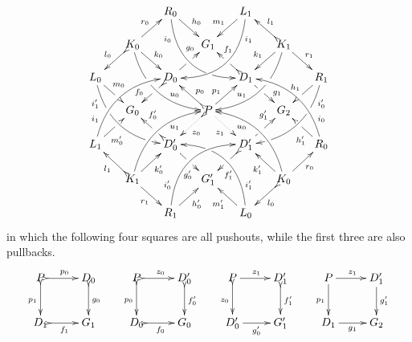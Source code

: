 \begin{lemma}
\begin{enumerate}
	\[\xymatrix@C=15pt@R=15pt{&&R_0 \ar@/_.8cm/[ddrr]_(.2){i_0}|(.7)\hole
		\ar[dr]^{h_0}&& L_1\ar@/^.8cm/[ddll]^(.2){i_1}
		\ar[dl]_{m_1}\\&K_0\ar[dr]^{k_0}\ar@{>->}[dl]_{l_0}
		\ar@/_.6cm/[ddrr]|(.36)\hole^(.65){u_0}\ar[ur]^{r_0}&& G_1 &&
		K_1
		\ar@/^.6cm/[ddll]|(.36)\hole_(.65){u_1}\ar[dl]_{k_1}\ar@{>->}[lu]_{l_1}
		\ar[dr]^{r_1}\\L_0
		\ar@/_.6cm/[ddrr]_(.2){i'_1}|(.31)\hole|(.81)\hole
		\ar[dr]^(.4){m_0}|(.61)\hole && D_0
		\ar@{>->}[dl]|(.4)\hole_(.65){f_0}\ar[ur]|(.5)\hole^(.7){g_0}&&D_1
		\ar[dr]|(.4)\hole^(.65){g_1}
		\ar@{>->}[ul]|(.5)\hole_(.65){f_1}&&R_1\ar@/^.6cm/[ddll]^(.2){i'_0}|(.31)\hole|(.81)\hole\ar[dl]_{h_1}|(.6)\hole\\&G_0
		&&P\ar@{.>}[dr]_{z_1}	\ar@{>.>}[dl]^{z_0}\ar[ur]^(.4){p_1}\ar@{>->}[ul]_(.4){p_0}&&G_2\\L_1	\ar@/^.6cm/[uurr]^(.2){i_1} \ar[ur]_(.35){m'_0}|(.61)\hole && D'_0	\ar@{>->}[ul]|(.4)\hole_(.65){f'_0}\ar[dr]|(.5)\hole_(.65){g'_0}	&&D'_1\ar[ur]|(.4)\hole^(.65){g'_1} \ar@{>->}[dl]|(.5)\hole^(.65){f'_1}	&& R_0 \ar[ul]^(.35){h'_1}|(.61)\hole\ar@/_.6cm/[uull]_(.2){i_0}\\ &K_1	\ar[ur]_{k'_0} \ar[dr]_{r_1}	\ar@{>->}[ul]^{l_1}\ar@/^.6cm/[uurr]_(.65){u_1}&&G'_1&& K_0\ar[ur]_{r_0} \ar[ul]^{k'_1} \ar@{>->}[dl]^{l_0} \ar@/_.6cm/[uull]^(.65){u_0}\\&& R_1	\ar[ur]_{h'_0}\ar@/^.8cm/[uurr]^(.2){i'_0}&& L_0 \ar[ul]^{m'_1} \ar@/_.8cm/[uull]_(.2){i'_1} |(.69)\hole }\] 
	in which the following four squares are all pushouts, while the first three are also pullbacks.
	\[\xymatrix{P \ar@{>->}[r]^{p_0} \ar@{>->}[d]_{p_1}& D_0 \ar@{>->}[d]^{g_0}  & P \ar@{>->}[r]^{z_0} \ar@{>->}[d]_{p_0}& D'_0 \ar@{>->}[d]^{f'_0} &  P \ar@{>->}[d]_{z_0} \ar[r]^{z_1} & D'_1 \ar@{>->}[d]^{f'_1} & P\ar[r]^{z_1} \ar[d]_{p_1}&D'_1 \ar[d]^{g'_1}\\ D_1 \ar@{>->}[r]_{f_1} & G_1  & D_0 \ar@{>->}[r]_{f_0} & G_0 & D'_0 \ar[r]_{g'_0}& G'_1 & D_1 \ar[r]_{g_1}& G_2}\]	
	\end{enumerate}
\end{lemma}

